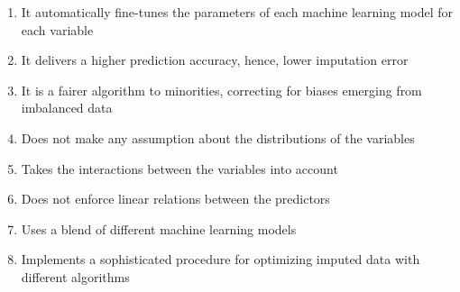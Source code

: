 \begin{enumerate}
    \item It automatically fine-tunes the parameters of each machine learning model for each variable
    
    \item It delivers a higher prediction accuracy, hence, lower imputation error
    
    \item It is a fairer algorithm to minorities, correcting for biases emerging from imbalanced data
    
    \item Does not make any assumption about the distributions of the variables
    
    \item Takes the interactions between the variables into account
    
    \item Does not enforce linear relations between the predictors
    
    \item Uses a blend of different machine learning models
    
    \item Implements a sophisticated procedure for optimizing imputed data with different algorithms

\end{enumerate}





